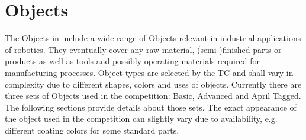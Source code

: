 \section{Objects} 
\label{ssec:ManipulationObjects}

The Objects in \RCAW include a wide range of Objects relevant in industrial applications of robotics. They eventually cover any raw material, (semi-)finished parts or products as well as tools and possibly operating materials required for manufacturing processes. Object types are selected by the TC and shall vary in complexity due to different shapes, colors and uses of objects. Currently there are three sets of Objects used in the competition: Basic, Advanced and April Tagged. The following sections provide details about those sets. The exact appearance of the object used in the competition can slightly vary due to availability, e.g. different coating colors for some standard parts.



%






